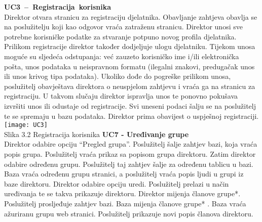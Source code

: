 				\noindent \textbf{UC3 – Registracija korisnika\\}
				Direktor otvara stranicu za registraciju djelatnika. Obavljanje zahtjeva obavlja se na poslužitelju koji kao odgovor vraća zatraženu stranicu. Direktor unosi sve potrebne korisničke podatke za stvaranje potpuno novog profila djelatnika. Prilikom registracije direktor također dodjeljuje ulogu djelatniku. Tijekom unosa moguće su sljedeća odstupanja: već zauzeto korisničko ime i/ili elektronička pošta, unos podataka u neispravnom formatu (ilegalni znakovi, predugačak unos ili unos krivog tipa podataka). Ukoliko dođe do pogreške prilikom unosa, poslužitelj obavještava direktora o neuspjelom zahtjevu i vraća ga na stranicu za registraciju. U takvom slučaju direktor ispravlja unos te ponovno pokušava izvršiti unos ili odustaje od registracije. Svi uneseni podaci šalju se na poslužitelj te se spremaju u bazu podataka. Direktor prima obavijest o uspješnoj registraciji.\\
				\texttt{[image: UC3]}\\
				Slika 3.2 Registracija korisnika
				\eject
				\noindent \textbf{UC7 - Uređivanje grupe\\}
				Direktor odabire opciju “Pregled grupa”. Poslužitelj šalje zahtjev bazi, koja vraća popis grupa. Poslužitelj vraća prikaz sa popisom grupa direktoru. Zatim direktor odabire određenu grupu. Poslužitelj taj zahtjev šalje za određenu tablicu u bazi. Baza vraća određenu grupu stranici, a poslužitelj vraća popis ljudi u grupi iz baze direktoru. Direktor odabire opciju uredi. Poslužitelj prelazi u način uređivanja te se takva prikazuje direktoru. Direktor mijenja članove grupe*. Poslužitelj prosljeđuje zahtjev bazi. Baza mijenja članove grupe* . Baza vraća ažuriranu grupu web stranici. Poslužitelj prikazuje novi popis članova direktoru. 
				

